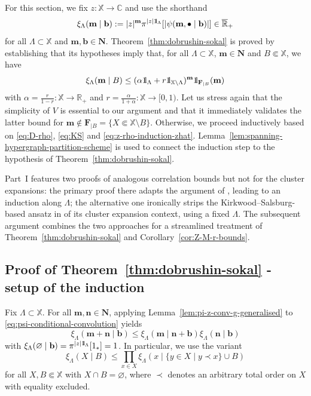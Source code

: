 \documentclass[reqno, 11pt]{amsart}
\theoremstyle{definition}
\newcommand{\R}{\mathbb{R}}
\newcommand{\C}{\mathbb{C}}
\newcommand{\X}{\mathbb X}
\newcommand{\be}{\begin{equation}}
\newcommand{\ee}{\end{equation}}
\def\1{{\mathchoice {1\mskip-4mu\mathrm l}      
{1\mskip-4mu\mathrm l}
{1\mskip-4.5mu\mathrm l} {1\mskip-5mu\mathrm l}}}
\begin{document}
For this section, we fix $z : \X \to \C$ and use the shorthand
\[
	\xi_\Lambda(\mathbf m \mid \mathbf b) : = |z|^\mathbf m \pi^{|z| \1_\Lambda}[|\psi(\mathbf m, \bullet \mid \mathbf b)|] \in \overline{\R}_+
\]
for all $\Lambda \subset \X$ and $\mathbf m, \mathbf b \in \mathbf N$. 
Theorem~\ref{thm:dobrushin-sokal} is proved by establishing that its hypotheses imply that, for all $\Lambda \subset \X$, $\mathbf m \in \mathbf N$ and $B \Subset \X$, we have
\be \label{eq:xi-leq-alpha-r-power-simple}
	\xi_\Lambda(\mathbf m \mid B) \leq (\alpha \1_\Lambda + r \1_{\X \setminus \Lambda})^\mathbf m \1_{\mathbf F_{\mid B}}(\mathbf m)
\ee
with $\alpha = \frac{r}{1-r} : \X \to \R_+$ and $r = \frac{\alpha}{1+\alpha} : \X \to [0, 1)$. 
Let us stress again that the simplicity of $V$ is essential to our argument and that it immediately validates the latter bound for $\mathbf m \notin \mathbf F_{\mid B} = \{X \Subset \X \setminus B\}$. 
Otherwise, we proceed inductively based on \eqref{eq:D-rho}, \eqref{eq:KS} and \eqref{eq:z-rho-induction-zhat}. 
Lemma~\ref{lem:spanning-hypergraph-partition-scheme} is used to connect the induction step to the hypothesis of Theorem~\ref{thm:dobrushin-sokal}.

Part~I features two proofs of analogous correlation bounds but not for the cluster expansions: 
the primary proof there adapts the argument of \cite{ref:bencs-buys}, leading to an induction along $\Lambda$; 
the alternative one ironically strips the Kirkwood--Salsburg-based ansatz in \cite{ref:jansen-kolesnikov} of its cluster expansion context, using a fixed $\Lambda$. 
The subsequent argument combines the two approaches for a streamlined treatment of Theorem~\ref{thm:dobrushin-sokal} and Corollary~\ref{cor:Z-M-r-bounds}.

\subsection{Proof of Theorem~\ref{thm:dobrushin-sokal} - setup of the induction}

Fix $\Lambda \subset \X$. 
For all $\mathbf m, \mathbf n \in \mathbf N$, applying Lemma~\ref{lem:pi-z-conv-g-generalised} to \eqref{eq:psi-conditional-convolution} yields
\[
	\xi_\Lambda(\mathbf m + \mathbf n \mid \mathbf b) \leq \xi_\Lambda(\mathbf m \mid \mathbf n + \mathbf b) \xi_\Lambda(\mathbf n \mid \mathbf b)
\]
with $\xi_\Lambda(\varnothing \mid \mathbf b) = \pi^{|z| \1_\Lambda}[1_\ast] = 1$. 
In particular, we use the variant
\be \label{eq:xi-leq-prod-xi}
	\xi_\Lambda(X \mid B) \leq \prod_{x \in X} \xi_\Lambda(x \mid \{y \in X \mid y \prec x\} \cup B)
\ee
for all $X, B \Subset \X$ with $X \cap B = \varnothing$, where $\prec$ denotes an arbitrary total order on $X$ with equality excluded.
\end{document}
